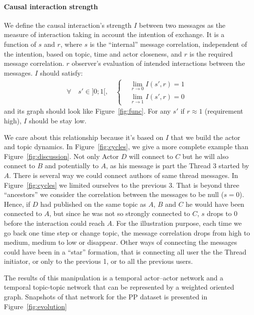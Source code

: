 \documentclass[a4paper,twoside]{article}
\begin{document}
\paragraph{Causal interaction strength}
We define the causal interaction's strength $I$ between two messages as the measure of interaction taking in account the intention of exchange.  It is a function of $s$ and $r$, where $s$ is the ``internal'' message correlation, independent of the intention, based on topic, time and actor closeness, and $r$ is the required message correlation. $r$ observer's evaluation of intended interactions between the messages.  $I$ should satisfy:
\begin{align*}
  \forall \quad s' \in ]0;1[, \quad \left \{
  \begin{aligned}
    &\lim\limits_{r \to 0} I(s',r) = 1 \\
    &\lim\limits_{r \to 1} I(s',r) = 0
      \end{aligned}  \right .
\end{align*}
and its graph should look like Figure~\ref{fig:func}.  For any $s'$ if $r\approx 1$ (requirement high), $I$ should be stay low.

We care about this relationship because it's based on $I$ that we build the actor and topic dynamics.  In Figure~\ref{fig:cycles}, we give a more complete example than Figure~\ref{fig:discussion}.  Not only Actor $D$ will connect to $C$ but he will also connect to $B$ and potentially to $A$, as his message is part the Thread 3 started by $A$.
There is several way we could connect authors of same thread messages.  In Figure~\ref{fig:cycles} we limited ourselves to the previous 3.  That is beyond three ``ancestors'' we consider the correlation between the messages to be null ($s=0$).  Hence, if $D$ had published on the same topic as $A$, $B$ and $C$ he would have been connected to $A$, but since he was not so strongly connected to $C$, $s$ drops to $0$ before the interaction could reach $A$.  For the illustration purpose, each time we go back one time step or change topic, the message correlation drops from high to medium, medium to low or disappear.  Other ways of connecting the messages could have been in a ``star'' formation, that is connecting all user the the Thread initiator, or only to the previous 1, or to all the previous users.

The results of this manipulation is a temporal actor--actor network and a temporal topic-topic network that can be represented by a weighted oriented graph.  Snapshots of that network for the PP dataset is presented in Figure~\ref{fig:evolution}
\end{document}
